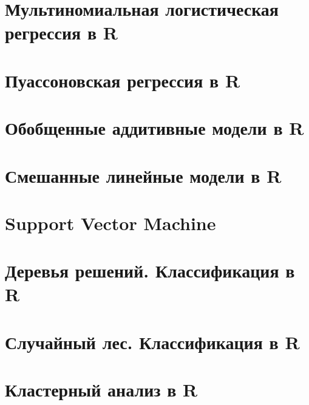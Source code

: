 \documentclass[
  letterpaper,
]{scrbook}
\theoremstyle{definition}
\theoremstyle{remark}
\begin{document}

\chapter{Мультиномиальная логистическая регрессия в
R}\label{randan-multinomlogreg}


\chapter{Пуассоновская регрессия в R}\label{randan-poissonreg}


\chapter{Обобщенные аддитивные модели в R}\label{randan-gam}


\chapter{Смешанные линейные модели в R}\label{randan-glmm}


\chapter{Support Vector Machine}\label{andan-svm}


\chapter{Деревья решений. Классификация в R}\label{randan-treesclass}


\chapter{Случайный лес. Классификация в R}\label{randan-randforestclass}


\chapter{Кластерный анализ в R}\label{randan-cluster}
\end{document}
